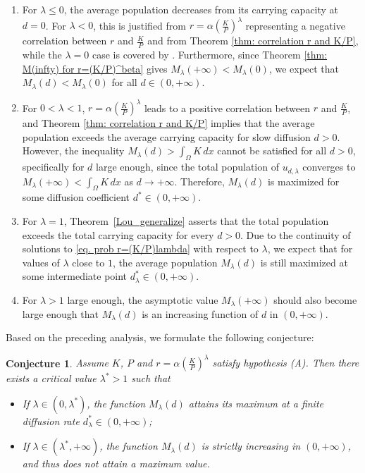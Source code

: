 \documentclass[11pt]{article}
\newcommand{\parentheses}[1]{\left(#1\right)}
\newtheorem*{conjecture*}{Conjecture}
\theoremstyle{definition}
\theoremstyle{remark}
\begin{document}
\begin{enumerate}
\item
For $\lambda\leq0$, the average population  decreases from its carrying capacity at $d=0$.
For $\lambda<0$, this is justified from $r=\alpha\parentheses{\frac{K}{P}}^\lambda$ representing a negative correlation between $r$ and $\frac{K}{P}$ and from Theorem \ref{thm: correlation r and K/P}, while the $\lambda=0$ case is covered by \cite{Guo_2020}. Furthermore,  since Theorem \ref{thm: M(infty) for r=(K/P)^beta} gives $M_\lambda(+\infty)<M_\lambda(0)$, we expect that $M_\lambda(d) < M_\lambda(0)$ for all $d\in(0,+\infty)$.

\item For $0<\lambda<1$,
$r=\alpha\parentheses{\frac{K}{P}}^\lambda$ leads to a positive correlation between $r$ and $\frac{K}{P}$, and Theorem \ref{thm: correlation r and K/P} implies that the average population exceeds the average carrying capacity for slow diffusion $d>0$. However, the inequality $M_\lambda(d)>\int_\Omega K\,dx$ cannot be satisfied for all $d>0$, specifically for $d$ large enough, since the total population of $u_{d,\lambda}$ converges to $M_\lambda(+\infty)<\int_\Omega K\,dx$ as $d\to+\infty$. Therefore, $M_\lambda(d)$ is maximized for some diffusion coefficient $d^*\in(0,+\infty)$.
\item For $\lambda=1$, Theorem~\ref{Lou_generalize} asserts that the total population exceeds the total carrying capacity for every $d>0$.
Due to the continuity of solutions to \eqref{eq. prob r=(K/P)lambda} with respect to $\lambda$, we expect that for values of $\lambda$ close to $1$, the average population $M_\lambda(d)$ is still maximized at some intermediate point $d_\lambda^*\in(0,+\infty)$.

\item
For $\lambda>1$ large enough, the asymptotic value $M_\lambda(+\infty)$ should also become large enough that $M_\lambda(d)$ is an increasing function of $d$ in $(0,+\infty)$.
\end{enumerate}

Based on the preceding analysis, we formulate the following conjecture:
\begin{conjecture*}
    Assume $K$, $P$ and $r=\alpha\parentheses{\frac{K}{P}}^\lambda$ satisfy hypothesis (A). Then there exists a critical value $\lambda^*>1$ such that 
    \begin{itemize}
        \item[a)] If $\lambda\in(0,\lambda^*)$, the function $M_\lambda(d)$ attains its maximum at a finite diffusion rate $d^*_\lambda\in(0,+\infty)$;
        
        \item[b)] If $\lambda\in(\lambda^*,+\infty)$, the function $M_\lambda(d)$ is strictly increasing in $(0,+\infty)$, and thus does not attain a maximum value.  
    \end{itemize}
\end{conjecture*}
\end{document}
